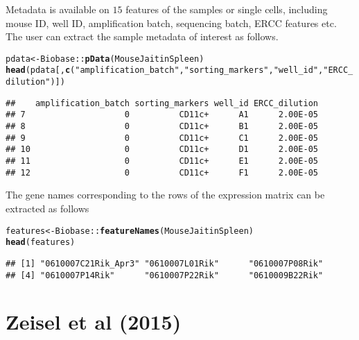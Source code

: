\documentclass[12pt]{article}\usepackage[]{graphicx}\usepackage[usenames,dvipsnames]{color}
\makeatletter
\newcommand{\hlstr}[1]{\textcolor[rgb]{0.192,0.494,0.8}{#1}}%
\newcommand{\hlopt}[1]{\textcolor[rgb]{0,0,0}{#1}}%
\newcommand{\hlstd}[1]{\textcolor[rgb]{0.345,0.345,0.345}{#1}}%
\newcommand{\hlkwb}[1]{\textcolor[rgb]{0.69,0.353,0.396}{#1}}%
\newcommand{\hlkwd}[1]{\textcolor[rgb]{0.737,0.353,0.396}{\textbf{#1}}}%
\newenvironment{kframe}{%
 \def\at@end@of@kframe{}%
 \ifinner\ifhmode%
  \def\at@end@of@kframe{\end{minipage}}%
  \begin{minipage}{\columnwidth}%
 \fi\fi%
 \def\FrameCommand##1{\hskip\@totalleftmargin \hskip-\fboxsep
 \colorbox{shadecolor}{##1}\hskip-\fboxsep
     \hskip-\linewidth \hskip-\@totalleftmargin \hskip\columnwidth}%
 \MakeFramed {\advance\hsize-\width
   \@totalleftmargin\z@ \linewidth\hsize
   \@setminipage}}%
 {\par\unskip\endMakeFramed%
 \at@end@of@kframe}
\newenvironment{knitrout}{}{} %
\makeatother
\begin{document}
Metadata is available on $15$ features of the samples or single cells,
including mouse ID, well ID, amplification batch, sequencing batch,
ERCC features etc. The user can extract the sample metadata of interest as follows.

\begin{knitrout}
\color{fgcolor}\begin{kframe}
\begin{alltt}
\hlstd{pdata} \hlkwb{<-} \hlstd{Biobase}\hlopt{::}\hlkwd{pData}\hlstd{(MouseJaitinSpleen)}
\hlkwd{head}\hlstd{(pdata[,}\hlkwd{c}\hlstd{(}\hlstr{"amplification_batch"}\hlstd{,}\hlstr{"sorting_markers"}\hlstd{,}\hlstr{"well_id"}\hlstd{,}\hlstr{"ERCC_dilution"}\hlstd{)])}
\end{alltt}
\begin{verbatim}
##    amplification_batch sorting_markers well_id ERCC_dilution
## 7                    0          CD11c+      A1      2.00E-05
## 8                    0          CD11c+      B1      2.00E-05
## 9                    0          CD11c+      C1      2.00E-05
## 10                   0          CD11c+      D1      2.00E-05
## 11                   0          CD11c+      E1      2.00E-05
## 12                   0          CD11c+      F1      2.00E-05
\end{verbatim}
\end{kframe}
\end{knitrout}

The gene names corresponding to the rows of the expression matrix can be extracted
as follows

\begin{knitrout}
\color{fgcolor}\begin{kframe}
\begin{alltt}
\hlstd{features} \hlkwb{<-} \hlstd{Biobase}\hlopt{::}\hlkwd{featureNames}\hlstd{(MouseJaitinSpleen)}
\hlkwd{head}\hlstd{(features)}
\end{alltt}
\begin{verbatim}
## [1] "0610007C21Rik_Apr3" "0610007L01Rik"      "0610007P08Rik"     
## [4] "0610007P14Rik"      "0610007P22Rik"      "0610009B22Rik"
\end{verbatim}
\end{kframe}
\end{knitrout}


\section{Zeisel et al (2015)}
\end{document}
